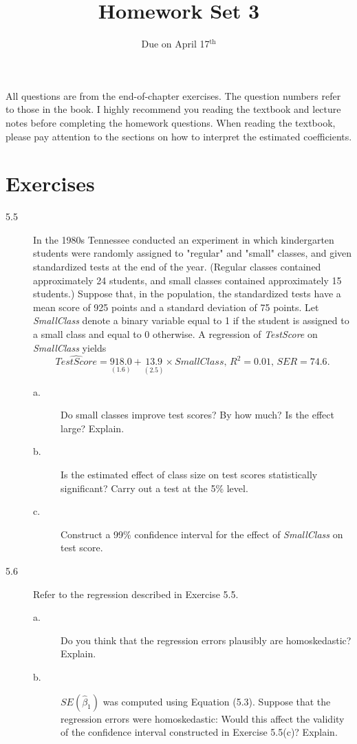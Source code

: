 \documentclass[a4paper,11pt]{article}
\date{Due on April 17\(^{\text{th}}\)}
\title{Homework Set 3}
\begin{document}
\maketitle
All questions are from the end-of-chapter exercises. The question
numbers refer to those in the book. I highly recommend you reading the
textbook and lecture notes before completing the homework
questions. When reading the textbook, please pay attention to the
sections on how to interpret the estimated coefficients.

\section*{Exercises}
\label{sec:org3f957c8}

\begin{description}
\item[{5.5}] In the 1980s Tennessee conducted an experiment in which
kindergarten students were randomly assigned to "regular" and
"small" classes, and given standardized tests at the end of
the year. (Regular classes contained approximately 24
students, and small classes contained approximately 15
students.) Suppose that, in the population, the standardized
tests have a mean score of 925 points and a standard
deviation of 75 points. Let \emph{SmallClass} denote a binary
variable equal to 1 if the student is assigned to a small
class and equal to 0 otherwise. A regression of \emph{TestScore}
on \emph{SmallClass} yields
\begin{equation*}
\widehat{TestScore} = \underset{\displaystyle (1.6)}{918.0} + \underset{\displaystyle (2.5)}{13.9} \times SmallClass,\, R^2 = 0.01,\, SER = 74.6.
\end{equation*}
\begin{description}
\item[{a.}] Do small classes improve test scores? By how much? Is the
effect large? Explain.
\item[{b.}] Is the estimated effect of class size on test scores
statistically significant? Carry out a test at the 5\% level.
\item[{c.}] Construct a 99\% confidence interval for the effect of
\emph{SmallClass} on test score.
\end{description}
\end{description}

\vspace{0.2cm}

\begin{description}
\item[{5.6}] Refer to the regression described in Exercise 5.5.
\begin{description}
\item[{a.}] Do you think that the regression errors plausibly are
homoskedastic? Explain.
\item[{b.}] \(SE(\hat{\beta}_1)\) was computed using Equation
(5.3). Suppose that the regression errors were
homoskedastic: Would this affect the validity of the
confidence interval constructed in Exercise 5.5(c)?
Explain.
\end{description}
\end{description}
\end{document}
